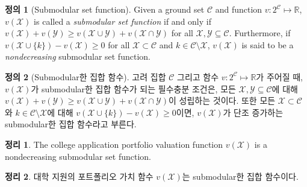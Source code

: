\documentclass[11pt]{article} %
\newtheorem{theorem}{Theorem}
\theoremstyle{definition}
\newtheorem{definition}{Definition}
\newtheorem{theorem}{정리}
\theoremstyle{definition}
\newtheorem{definition}{정의}
\begin{document}
\ifen
\begin{definition}[Submodular set function]
Given a ground set $\mathcal{C}$ and function $v : 2^{\mathcal{C}} \mapsto \mathbb{R}$, $v(\mathcal{X})$ is called a \emph{submodular set function} if and only if $v(\mathcal{X}) + v(\mathcal{Y}) \geq v(\mathcal{X}\cup\mathcal{Y}) + v(\mathcal{X}\cap\mathcal{Y})$
for all $\mathcal{X}, \mathcal{Y} \subseteq \mathcal{C}$. Furthermore, if $ v(\mathcal{X}\cup\{k\}) - v(\mathcal{X}) \geq 0$ for all $\mathcal{X} \subset \mathcal{C}$ and $k \in \mathcal{C} \setminus \mathcal{X}$, $v(\mathcal{X})$ is said to be a \emph{nondecreasing} submodular set function.
\end{definition}
\else
\begin{definition}[Submodular한 집합 함수]
고려 집합 $\mathcal{C}$ 그리고 함수 $v : 2^{\mathcal{C}} \mapsto \mathbb{R}$가 주어질 때, $v(\mathcal{X})$가 submodular한 집합 함수가 되는 필수충분 조건은, 모든 $\mathcal{X}, \mathcal{Y} \subseteq \mathcal{C}$에 대해 $v(\mathcal{X}) + v(\mathcal{Y}) \geq v(\mathcal{X}\cup\mathcal{Y}) + v(\mathcal{X}\cap\mathcal{Y})$이 성립하는 것이다. 또한 모든 $\mathcal{X} \subset \mathcal{C}$와 $k \in \mathcal{C} \setminus \mathcal{X}$에 대해 $v(\mathcal{X}\cup\{k\}) - v(\mathcal{X}) \geq 0$이면, $v(\mathcal{X})$가 단조 증가하는 submodular한 집합 함수라고 부른다.
\end{definition}
\fi

\ifen
\begin{theorem}
The college application portfolio valuation function
$v(\mathcal{X})$ %
is a nondecreasing submodular set function.
\end{theorem}
\else
\begin{theorem}
대학 지원의 포트폴리오 가치 함수 $v(\mathcal{X})$는 submodular한 집합 함수이다.
\end{theorem}
\fi
\end{document}
